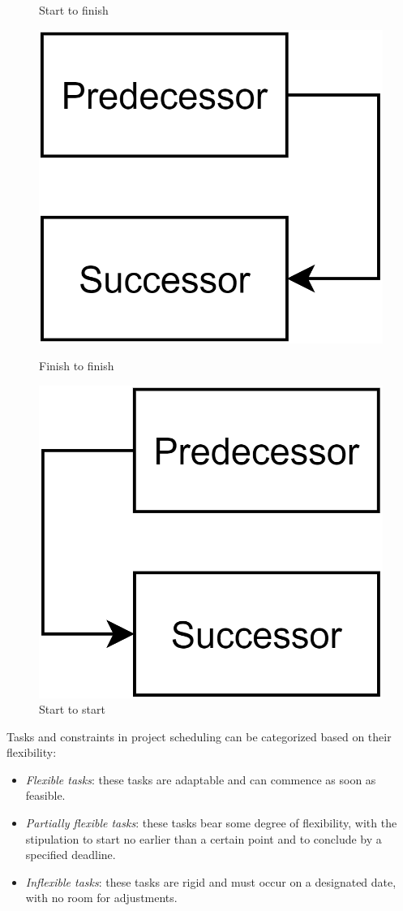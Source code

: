 \begin{itemize}
\begin{figure}[H]
\begin{minipage}[b]{0.4\linewidth}
                \caption*{Start to finish} 
                \vspace{4ex}
            \end{minipage} 
            \begin{minipage}[b]{0.4\linewidth}
                \centering
                \includegraphics[width=0.4\linewidth]{images/ftf.png} 
                \caption*{Finish to finish} 
                \vspace{4ex}
            \end{minipage}%
            \begin{minipage}[b]{0.4\linewidth}
                \centering
                \includegraphics[width=0.4\linewidth]{images/sts.png} 
                \caption*{Start to start} 
                \vspace{4ex}
            \end{minipage} 
        \end{figure}
        Tasks and constraints in project scheduling can be categorized based on their flexibility:
        \begin{itemize}
            \item \textit{Flexible tasks}: these tasks are adaptable and can commence as soon as feasible.
            \item \textit{Partially flexible tasks}: these tasks bear some degree of flexibility, with the stipulation to start no earlier than a certain point and to conclude by a specified deadline.
            \item \textit{Inflexible tasks}: these tasks are rigid and must occur on a designated date, with no room for adjustments. 

\end{itemize}
\end{itemize}
